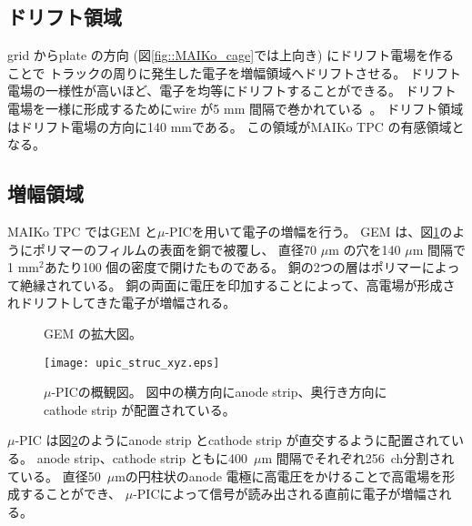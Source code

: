\documentclass[../master]{subfiles}
\begin{document}

\subsection{ドリフト領域}
grid からplate の方向 (図\ref{fig::MAIKo_cage}では上向き) にドリフト電場を作ることで
トラックの周りに発生した電子を増幅領域へドリフトさせる。
ドリフト電場の一様性が高いほど、電子を均等にドリフトすることができる。
ドリフト電場を一様に形成するためにwire が5 mm 間隔で巻かれている~\cite{furuno}。
ドリフト領域はドリフト電場の方向に140 mmである。
この領域がMAIKo TPC の有感領域となる。

\subsection{増幅領域}
MAIKo TPC ではGEM と$\mu$-PICを用いて電子の増幅を行う。
GEM は、図\ref{pic::GEM}のようにポリマーのフィルムの表面を銅で被覆し、
直径70 $\mu$m の穴を140 $\mu$m 間隔で1 mm$^2$あたり100 個の密度で開けたものである。
銅の2つの層はポリマーによって絶縁されている。
銅の両面に電圧を印加することによって、高電場が形成されドリフトしてきた電子が増幅される。
\begin{figure}
  \centering
  \caption{GEM の拡大図。}
  \label{pic::GEM}  
\end{figure}
\begin{figure}
  \centering
  \texttt{[image: upic\_struc\_xyz.eps]}
  \caption[$\mu$-PICの概観図。]{$\mu$-PICの概観図。
    図中の横方向にanode strip、奥行き方向にcathode strip が配置されている。
  }
  \label{fig::mupic}
\end{figure}
$\mu$-PIC は図\ref{fig::mupic}のようにanode strip とcathode strip が直交するように配置されている。
anode strip、cathode strip ともに400~$\mu$m 間隔でそれぞれ256~ch分割されている。
直径50~$\mu$mの円柱状のanode 電極に高電圧をかけることで高電場を形成することができ、
$\mu$-PICによって信号が読み出される直前に電子が増幅される。
\end{document}
